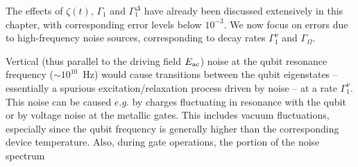 The effects of $\zeta(t)$, $\Gamma_1$ and $\Gamma_1^{\Delta}$ have already been discussed extensively in this chapter, with corresponding error levels below $10^{-3}$. We now focus on errors due to high-frequency noise sources, corresponding to decay rates $\Gamma_1^{\nu}$ and $\Gamma_\Omega$.

Vertical (thus parallel to the driving field $E_{\rm ac}$) noise at the qubit resonance frequency ($\sim 10^{10}$~Hz) would cause transitions between the qubit eigenstates -- essentially a spurious excitation/relaxation process driven by noise -- at a rate $\Gamma_1^{\nu}$. This noise can be caused $e.g.$ by charges fluctuating in resonance with the qubit or by voltage noise at the metallic gates. This includes vacuum fluctuations, especially since the qubit frequency is generally higher than the corresponding device temperature. Also, during gate operations, the portion of the noise spectrum %
